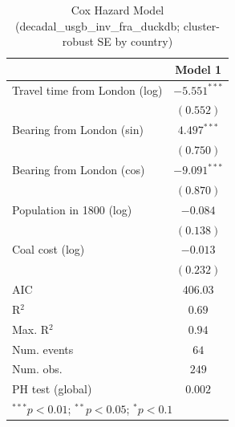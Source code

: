 
\begin{table}
\begin{center}
\begin{tabular}{l c}
\hline
 & Model 1 \\
\hline
Travel time from London (log) & $-5.551^{***}$ \\
 & $(0.552)$ \\
Bearing from London (sin) & $4.497^{***}$ \\
 & $(0.750)$ \\
Bearing from London (cos) & $-9.091^{***}$ \\
 & $(0.870)$ \\
Population in 1800 (log) & $-0.084$ \\
 & $(0.138)$ \\
Coal cost (log) & $-0.013$ \\
 & $(0.232)$ \\
\hline
AIC              & $406.03$ \\
R$^2$            & $0.69$ \\
Max. R$^2$       & $0.94$ \\
Num. events      & $64$ \\
Num. obs.        & $249$ \\
PH test (global) & $0.002$ \\
\hline
\multicolumn{2}{l}{\scriptsize{$^{***}p<0.01$; $^{**}p<0.05$; $^{*}p<0.1$}}
\end{tabular}
\caption{Cox Hazard Model (decadal\_usgb\_inv\_fra\_duckdb; cluster-robust SE by country)}
\label{tab:cox_serious_decadal_usgb_inv_fra_duckdb}
\end{center}
\end{table}
